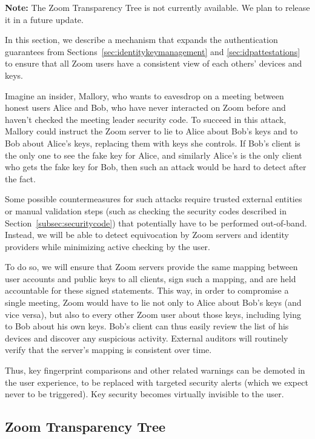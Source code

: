 \textbf{Note:} The Zoom Transparency Tree is not currently available. We plan to release it in a
future update.

In this section, we describe a mechanism that expands the authentication guarantees from
Sections~\ref{sec:identitykeymanagement} and \ref{sec:idpattestations} to ensure that all Zoom users
have a consistent view of each others' devices and keys.

Imagine an insider, Mallory, who wants to eavesdrop on a meeting between honest users Alice and Bob,
who have never interacted on Zoom before and haven't checked the meeting leader security code. To
succeed in this attack, Mallory could instruct the Zoom server to lie to Alice about Bob's keys and
to Bob about Alice's keys, replacing them with keys she controls. If Bob's client is the only one to
see the fake key for Alice, and similarly Alice's is the only client who gets the fake key for Bob,
then such an attack would be hard to detect after the fact.

Some possible countermeasures for such attacks require trusted external entities or manual
validation steps (such as checking the security codes described in
Section~\ref{subsec:securitycode}) that potentially have to be performed out-of-band. Instead, we
will be able to detect equivocation by Zoom servers and identity providers while minimizing active
checking by the user.

To do so, we will ensure that Zoom servers provide the same mapping between user accounts and public
keys to all clients, sign such a mapping, and are held accountable for these signed statements. This
way, in order to compromise a single meeting, Zoom would have to lie not only to Alice about Bob's
keys (and vice versa), but also to every other Zoom user about those keys, including lying to Bob
about his own keys. Bob's client can thus easily review the list of his devices and discover any
suspicious activity. External auditors will routinely verify that the server's mapping is consistent
over time.

Thus, key fingerprint comparisons and other related warnings can be demoted in the user experience,
to be replaced with targeted security alerts (which we expect never to be triggered). Key security
becomes virtually invisible to the user.

\subsection{Zoom Transparency Tree}


